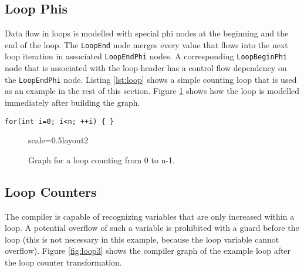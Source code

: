 \documentclass[twocolumn]{svjour3}
\newcommand\nodename[1]{\texttt{#1}}
\begin{document}
\subsection{Loop Phis}
Data flow in loops is modelled with special phi nodes at the beginning and the end of the loop.
The \nodename{LoopEnd} node merges every value that flows into the next loop iteration in associated \nodename{LoopEndPhi} nodes.
A corresponding \nodename{LoopBeginPhi} node that is associated with the loop header has a control flow dependency on the \nodename{LoopEndPhi} node.
Listing \ref{lst:loop} shows a simple counting loop that is used as an example in the rest of this section.
Figure \ref{fig:loop2} shows how the loop is modelled immediately after building the graph.

\begin{lstlisting}[label=lst:loop, caption=Loop example, captionpos=b]
for(int i=0; i<n; ++i) { }
\end{lstlisting}



\begin{figure}[h]
  \centering
\begin{digraphenv}{scale=0.5}{layout2}
\end{digraphenv}
  \caption{Graph for a loop counting from 0 to n-1.}
  \label{fig:loop2}
\end{figure}

\subsection{Loop Counters}
The compiler is capable of recognizing variables that are only increased within a loop.
A potential overflow of such a variable is prohibited with a guard before the loop (this is not necessary in this example, because the loop variable cannot overflow).
Figure \ref{fig:loop3} shows the compiler graph of the example loop after the loop counter transformation.
\end{document}
